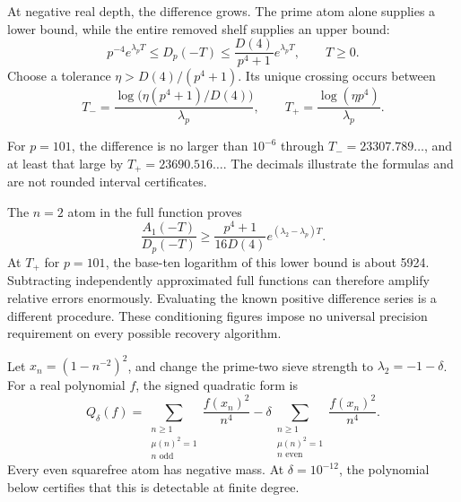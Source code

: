 At negative real depth, the difference grows. The prime atom alone supplies
a lower bound, while the entire removed shelf supplies an upper bound:
\[
p^{-4}e^{\lambda_pT}\le D_p(-T)
\le\frac{D(4)}{p^4+1}e^{\lambda_pT},\qquad T\ge0.
\]
Choose a tolerance $\eta>D(4)/(p^4+1)$. Its unique crossing occurs between
\[
T_- =\frac{\log\!\bigl(\eta(p^4+1)/D(4)\bigr)}{\lambda_p},
\qquad
T_+ =\frac{\log(\eta p^4)}{\lambda_p}.
\]


For $p=101$, the difference is no larger than $10^{-6}$ through
$T_-=23307.789\ldots$, and at least that large by
$T_+=23690.516\ldots$. The decimals illustrate the formulas and are not
rounded interval certificates.

The $n=2$ atom in the full function proves
\[
\frac{A_1(-T)}{D_p(-T)}
\ge\frac{p^4+1}{16D(4)}e^{(\lambda_2-\lambda_p)T}.
\]
At $T_+$ for $p=101$, the base-ten logarithm of this lower bound is about
5924. Subtracting independently approximated full functions can therefore
amplify relative errors enormously. Evaluating the known positive difference
series is a different procedure. These conditioning figures impose no
universal precision requirement on every possible recovery algorithm.

Let $x_n=(1-n^{-2})^2$, and change the prime-two sieve strength to
$\lambda_2=-1-\delta$. For a real polynomial $f$, the signed quadratic form is
\[
Q_\delta(f)=\sum_{\substack{n\ge1\\\mu(n)^2=1\\n\text{ odd}}}
 \frac{f(x_n)^2}{n^4}
-\delta\sum_{\substack{n\ge1\\\mu(n)^2=1\\n\text{ even}}}
 \frac{f(x_n)^2}{n^4}.
\]
Every even squarefree atom has negative mass. At $\delta=10^{-12}$,
the polynomial below certifies that this is detectable at finite degree.


